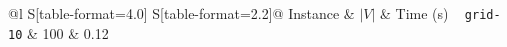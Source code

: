 \documentclass{article}
\begin{document}
\begin{tabular}{@{}l S[table-format=4.0] S[table-format=2.2]@{}}
  \toprule
  Instance & {$|V|$} & {Time (s)} \
  \midrule
  \texttt{grid-10} &  100 &  0.12 \
  \bottomrule
\end{tabular}
\end{document}
